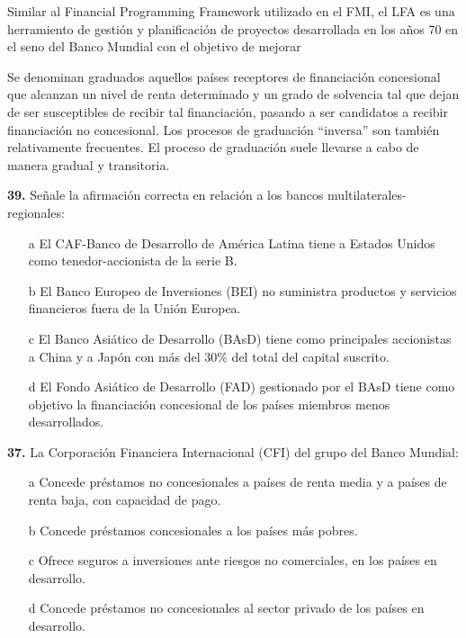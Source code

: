 \documentclass{nuevotema}
\begin{document}
\conceptos



Similar al Financial Programming Framework utilizado en el FMI, el LFA es una herramiento de gestión y planificación de proyectos desarrollada en los años 70 en el seno del Banco Mundial con el objetivo de mejorar 



Se denominan graduados aquellos países receptores de financiación concesional que alcanzan un nivel de renta determinado y un grado de solvencia tal que dejan de ser susceptibles de recibir tal financiación, pasando a ser candidatos a recibir financiación no concesional. Los procesos de graduación ``inversa'' son también relativamente frecuentes. El proceso de graduación suele llevarse a cabo de manera gradual y transitoria. 


\preguntas


\textbf{39.} Señale la afirmación correcta en relación a los bancos multilaterales-regionales:

\begin{itemize}
	\item[a] El CAF-Banco de Desarrollo de América Latina tiene a Estados Unidos como tenedor-accionista de la serie B.
	\item[b] El Banco Europeo de Inversiones (BEI) no suministra productos y servicios financieros fuera de la Unión Europea.
	\item[c] El Banco Asiático de Desarrollo (BAsD) tiene como principales accionistas a China y a Japón con más del $30\%$ del total del capital suscrito.
	\item[d] El Fondo Asiático de Desarrollo (FAD) gestionado por el BAsD tiene como objetivo la financiación concesional de los países miembros menos desarrollados.
\end{itemize}


\textbf{37.} La Corporación Financiera Internacional (CFI) del grupo del Banco Mundial:

\begin{itemize}
	\item[a] Concede préstamos no concesionales a países de renta media y a países de renta baja, con capacidad de pago.
	\item[b] Concede préstamos concesionales a los países más pobres.
	\item[c] Ofrece seguros a inversiones ante riesgos no comerciales, en los países en desarrollo.
	\item[d] Concede préstamos no concesionales al sector privado de los países en desarrollo.
\end{itemize}
\end{document}
